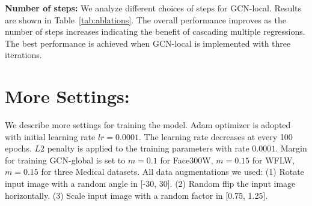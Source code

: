 \documentclass[runningheads]{llncs}
\begin{document}
\textbf{Number of steps:} We analyze different choices of steps for GCN-local. Results are shown in Table~\ref{tab:ablations}. The overall performance improves as the number of steps increases indicating the benefit of cascading multiple regressions. The best performance is achieved when GCN-local is implemented with three iterations. 

\section{More Settings:}
We describe more settings for training the model. Adam optimizer is adopted with initial learning rate $lr=0.0001$. The learning rate decreases at every 100 epochs. $L2$ penalty is applied to the training parameters with rate $0.0001$. Margin for training GCN-global is set to $m=0.1$ for Face300W, $m=0.15$ for WFLW, $m=0.15$ for three Medical datasets. All data augmentations we used: (1) Rotate input image with a random angle in [-30, 30]. (2) Random flip the input image horizontally. (3) Scale input image with a random factor in [0.75, 1.25].



\clearpage


\end{document}

